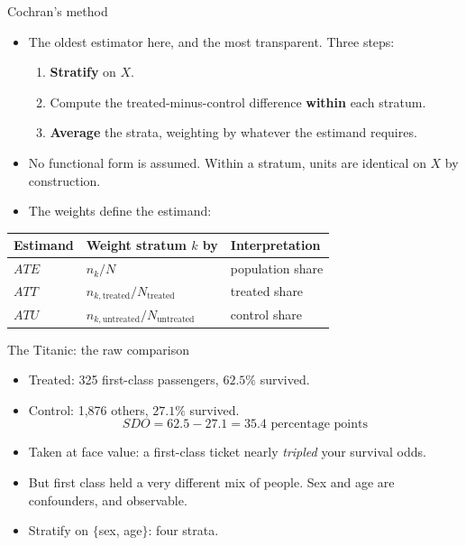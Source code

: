 \documentclass[
  11pt,
  ignorenonframetext,
  aspectratio=169,
]{beamer}
\providecommand{\tightlist}{%
  \setlength{\itemsep}{0pt}\setlength{\parskip}{0pt}}
\begin{document}
\begin{frame}{Cochran's method}
\protect{}\label{cochrans-method}
\begin{itemize}
\tightlist
\item
  The oldest estimator here, and the most transparent. Three steps:

  \begin{enumerate}
  \tightlist
  \item
    \textbf{Stratify} on \(X\).
  \item
    Compute the treated-minus-control difference \textbf{within} each
    stratum.
  \item
    \textbf{Average} the strata, weighting by whatever the estimand
    requires.
  \end{enumerate}
\item
  No functional form is assumed. Within a stratum, units are identical
  on \(X\) by construction.
\item
  The weights define the estimand:
\end{itemize}

\begin{center}
\begin{tabular}{lll}
\toprule
Estimand & Weight stratum $k$ by & Interpretation \\
\midrule
$ATE$ & $n_k / N$                      & population share \\
$ATT$ & $n_{k,\text{treated}} / N_{\text{treated}}$   & treated share \\
$ATU$ & $n_{k,\text{untreated}} / N_{\text{untreated}}$ & control share \\
\bottomrule
\end{tabular}
\end{center}
\end{frame}

\begin{frame}{The Titanic: the raw comparison}
\protect{}\label{the-titanic-the-raw-comparison}
\begin{itemize}
\tightlist
\item
  Treated: 325 first-class passengers, \(62.5\%\) survived.
\item
  Control: 1,876 others, \(27.1\%\) survived. \[
  SDO = 62.5 - 27.1 = 35.4 \text{ percentage points}
  \]
\item
  Taken at face value: a first-class ticket nearly \emph{tripled} your
  survival odds.
\item
  But first class held a very different mix of people. Sex and age are
  confounders, and observable.
\item
  Stratify on \(\{\)sex, age\(\}\): four strata.
\end{itemize}
\end{frame}
\end{document}
